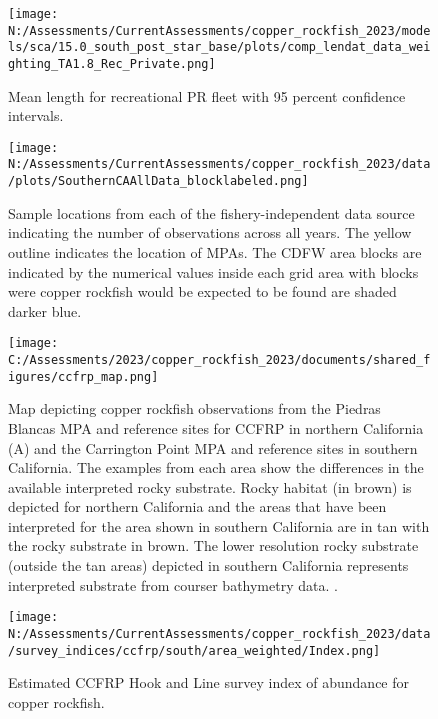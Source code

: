 \documentclass[11pt,
  english,
  letterpaper,
]{article}
\begin{document}
\pagebreak

\begin{figure}
\centering
\texttt{[image: N:/Assessments/CurrentAssessments/copper\_rockfish\_2023/models/sca/15.0\_south\_post\_star\_base/plots/comp\_lendat\_data\_weighting\_TA1.8\_Rec\_Private.png]}
\caption{Mean length for recreational PR fleet with 95 percent confidence intervals.\label{fig:mean-rec-pr-len-data}}
\end{figure}

\pagebreak

\begin{figure}
\centering
\texttt{[image: N:/Assessments/CurrentAssessments/copper\_rockfish\_2023/data/plots/SouthernCAAllData\_blocklabeled.png]}
\caption{Sample locations from each of the fishery-independent data source indicating the number of observations across all years. The yellow outline indicates the location of MPAs. The CDFW area blocks are indicated by the numerical values inside each grid area with blocks were copper rockfish would be expected to be found are shaded darker blue.\label{fig:survey-locations}}
\end{figure}

\pagebreak

\begin{figure}
\centering
\texttt{[image: C:/Assessments/2023/copper\_rockfish\_2023/documents/shared\_figures/ccfrp\_map.png]}
\caption{Map depicting copper rockfish observations from the Piedras Blancas MPA and reference sites for CCFRP in northern California (A) and the Carrington Point MPA and reference sites in southern California. The examples from each area show the differences in the available interpreted rocky substrate. Rocky habitat (in brown) is depicted for northern California and the areas that have been interpreted for the area shown in southern California are in tan with the rocky substrate in brown. The lower resolution rocky substrate (outside the tan areas) depicted in southern California represents interpreted substrate from courser bathymetry data. .\label{fig:ccfrp-map}}
\end{figure}

\begin{figure}
\centering
\texttt{[image: N:/Assessments/CurrentAssessments/copper\_rockfish\_2023/data/survey\_indices/ccfrp/south/area\_weighted/Index.png]}
\caption{Estimated CCFRP Hook and Line survey index of abundance for copper rockfish.\label{fig:ccfrp-index-main}}
\end{figure}
\end{document}
